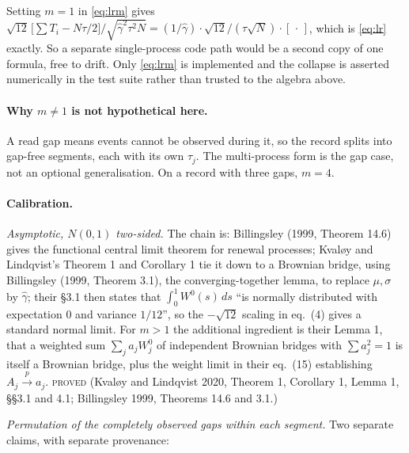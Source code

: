 \documentclass[11pt,a4paper]{article}
\newcommand{\Wbridge}{W^{0}}
\newcommand{\gh}{\hat\gamma}
\newcommand{\PROVED}{\textsc{\textcolor{blue!55!black}{proved}}}
\begin{document}
Setting $m = 1$ in \eqref{eq:lrm} gives
$\sqrt{12}\,\bigl[\textstyle\sum T_i - N\tau/2\bigr] \big/ \sqrt{\gh^2\tau^2 N}
= (1/\gh)\cdot\sqrt{12}/(\tau\sqrt{N})\cdot[\,\cdot\,]$, which is \eqref{eq:lr}
exactly. So a separate single-process code path would be a second copy of one formula,
free to drift. Only \eqref{eq:lrm} is implemented and the collapse is asserted
numerically in the test suite rather than trusted to the algebra above.

\paragraph{Why $m \neq 1$ is not hypothetical here.} A read gap means events cannot be
observed during it, so the record splits into gap-free segments, each with its own
$\tau_j$. The multi-process form is the gap case, not an optional generalisation. On a
record with three gaps, $m = 4$.

\paragraph{Calibration.}

\emph{Asymptotic, $N(0,1)$ two-sided.} The chain is: Billingsley (1999, Theorem 14.6)
gives the functional central limit theorem for renewal processes; Kvaløy and Lindqvist's
Theorem 1 and Corollary 1 tie it down to a Brownian bridge, using Billingsley (1999,
Theorem 3.1), the converging-together lemma, to replace $\mu,\sigma$ by $\gh$; their
\S 3.1 then states that $\int_0^1 \Wbridge(s)\,ds$ \enquote{is normally distributed with
expectation 0 and variance $1/12$}, so the $-\sqrt{12}$ scaling in eq.~(4) gives a
standard normal limit. For $m>1$ the additional ingredient is their Lemma 1, that a
weighted sum $\sum_j a_j W_j^0$ of independent Brownian bridges with $\sum a_j^2 = 1$ is
itself a Brownian bridge, plus the weight limit in their eq.~(15) establishing
$A_j \xrightarrow{p} a_j$. \PROVED{} (Kvaløy and Lindqvist 2020, Theorem 1, Corollary 1,
Lemma 1, \S\S 3.1 and 4.1; Billingsley 1999, Theorems 14.6 and 3.1.)

\emph{Permutation of the completely observed gaps within each segment.} Two separate
claims, with separate provenance:
\end{document}
